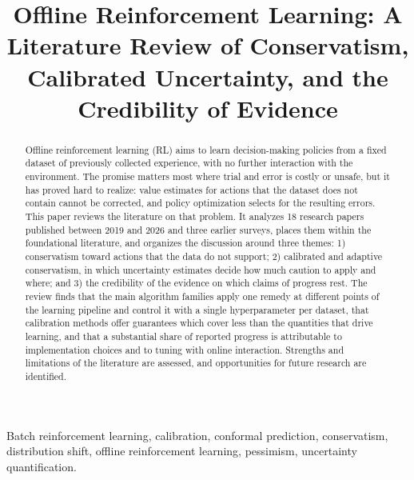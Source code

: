 \documentclass[conference]{IEEEtran}
\begin{document}
\title{Offline Reinforcement Learning: A Literature Review of Conservatism, Calibrated Uncertainty, and the Credibility of Evidence}

\author{
}

\maketitle

\begin{abstract}
Offline reinforcement learning (RL) aims to learn decision-making policies from a fixed dataset of previously collected experience, with no further interaction with the environment. The promise matters most where trial and error is costly or unsafe, but it has proved hard to realize: value estimates for actions that the dataset does not contain cannot be corrected, and policy optimization selects for the resulting errors. This paper reviews the literature on that problem. It analyzes 18 research papers published between 2019 and 2026 and three earlier surveys, places them within the foundational literature, and organizes the discussion around three themes: 1) conservatism toward actions that the data do not support; 2) calibrated and adaptive conservatism, in which uncertainty estimates decide how much caution to apply and where; and 3) the credibility of the evidence on which claims of progress rest. The review finds that the main algorithm families apply one remedy at different points of the learning pipeline and control it with a single hyperparameter per dataset, that calibration methods offer guarantees which cover less than the quantities that drive learning, and that a substantial share of reported progress is attributable to implementation choices and to tuning with online interaction. Strengths and limitations of the literature are assessed, and opportunities for future research are identified.
\end{abstract}

\begin{IEEEkeywords}
Batch reinforcement learning, calibration, conformal prediction, conservatism, distribution shift, offline reinforcement learning, pessimism, uncertainty quantification.
\end{IEEEkeywords}

\end{document}
